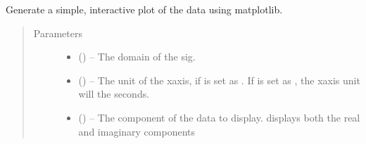 \documentclass[letterpaper,10pt,english]{sphinxmanual}
\begin{document}
\begin{fulllineitems}
\begin{fulllineitems}
\label{\detokenize{references/core:nmrespy.core.Estimator.view_data}}
\sphinxAtStartPar
Generate a simple, interactive plot of the data using matplotlib.
\begin{quote}\begin{description}
\item[{Parameters}] \leavevmode\begin{itemize}
\item {} 
\sphinxAtStartPar
{} (\sphinxstyleliteralemphasis{\sphinxupquote{, }}) – The domain of the sig.

\item {} 
\sphinxAtStartPar
{} (\sphinxstyleliteralemphasis{\sphinxupquote{, }}) – The unit of the x\sphinxhyphen{}axis, if  is set as . If
 is set as , the x\sphinxhyphen{}axis unit will the seconds.

\item {} 
\sphinxAtStartPar
{} (\sphinxstyleliteralemphasis{\sphinxupquote{, }}\sphinxstyleliteralemphasis{\sphinxupquote{, }}) – The component of the data to display.  displays both
the real and imaginary components

\end{itemize}

\end{description}\end{quote}


\end{fulllineitems}
\end{fulllineitems}
\end{document}
